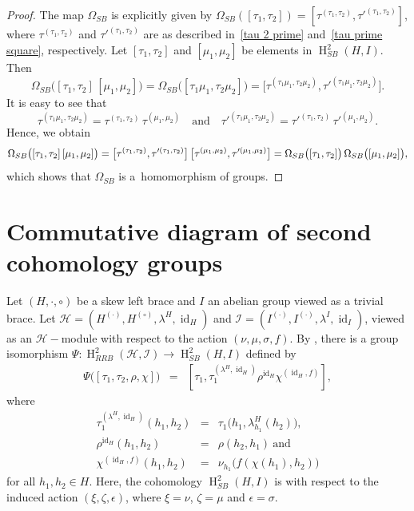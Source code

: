 \documentclass{jonasart}
\theoremstyle{plain}
\DeclareMathOperator{\Ho}{H}
\DeclareMathOperator{\Id}{id}
\begin{document}
	\begin{proof}
		The map $\Omega_{SB}$ is explicitly given by $\Omega_{SB}([\tau_1,\tau_2 ])=[\tau^{(\tau_1,\tau_2 )},\tau'^{(\tau_1,\tau_2 )}]$, where $\tau^{(\tau_1,\tau_2 )}$ and $\tau'^{(\tau_1,\tau_2 )}$ are as described in~\eqref{tau 2 prime} and~\eqref{tau prime square}, respectively.	Let $[\tau_1, \tau_2 ]$ and $[\mu_1,\mu_2 ]$ be elements in $\Ho^2_{SB}(H,I)$. Then
		\[
		\Omega_{SB} \big( [\tau_1,\tau_2] \, [\mu_1,\mu_2] \big) = \Omega_{SB} \big( [\tau_1 \mu_1, \tau_2 \mu_2]\big) =\big[\tau^{(\tau_1 \mu_1, \tau_2 \mu_2)},\tau'^{(\tau_1 \mu_1, \tau_2\mu_2)} \big].
		\]
		It is easy to see that
		\[
		\tau^{(\tau_1 \mu_1, \tau_2 \mu_2)}=	\tau^{(\tau_1, \tau_2)}\, \tau^{(\mu_1,\mu_2)} \quad \textrm{and} \quad  \tau'^{(\tau_1 \mu_1,\tau_2 \mu_2)}=	\tau'^{(\tau_1, \tau_2)}\, \tau'^{(\mu_1, \mu_2)}.
		\]
		Hence, we obtain
		\[
		\Omega_{SB} \big( [\tau_1, \tau_2] \, [\mu_1,\mu_2] \big) = \big[\tau^{(\tau_1, \tau_2)},\tau'^{(\tau_1, \tau_2)}\big] \, \big[\tau^{(\mu_1, \mu_2)},\tau'^{(\mu_1,\mu_2)}\big]\\
		= \Omega_{SB} \big( [\tau_1, \tau_2]\big) \, \Omega_{SB} \big([\mu_1,\mu_2] \big),
		\]
		which shows that $\Omega_{SB}$ is a~homomorphism of groups.
	\end{proof}
	
	
	\section{Commutative diagram of second cohomology groups}\label{section comm diag homol groups}
	
	Let $(H,\cdot,\circ)$ be a skew left brace and $I$ an abelian group viewed as a trivial brace. Let $\mathcal{H}=(H^{(\cdot)},H^{(\circ)},\lambda^H, \Id_H)$ and  $\mathcal{I}=(I^{(\cdot)},I^{(\cdot)},\lambda^I, \Id_I)$, viewed as an $\mathcal{H}-$module with respect to the action $(\nu,\mu,\sigma,f)$. By \cite[Proposition 4.4 and Corollary 4.6]{MR4819014}, there is a group isomorphism $\Psi: \Ho^2_{RRB}(\mathcal{H},\mathcal{I})\to \Ho^2_{SB}(H,I)$ defined by
	\begin{eqnarray}\label{defn of Psi}
		\Psi \big([\tau_1,\tau_2,\rho,\chi] \big)&=&[\tau_1, \tau^{(\lambda^H, \Id_H)}_1\rho^{\Id_H}\chi^{(\Id_H, f)} ],
	\end{eqnarray}
	where
	\begin{eqnarray}
		\tau^{(\lambda^H, \Id_H)}_1(h_1, h_2) &=&  \tau_1 \big(h_1, \lambda^H_{h_1}(h_2)\big), \nonumber\\
		\rho^{\Id_H}(h_1, h_2) &=&\rho(h_2, h_1)~\textrm{and} \nonumber\\
		\chi^{(\Id_H, f)}(h_1, h_2) & =& \nu_{h_1} \big( f(\chi(h_1), h_2) \big) \label{defn of chi id f}
	\end{eqnarray}
	for all $h_1, h_2 \in H$. Here, the cohomology $\Ho^2_{SB}(H,I)$ is with respect to the induced action $(\xi,\zeta,\epsilon)$, where $\xi=\nu$, $\zeta=\mu$ and $\epsilon=\sigma$.
	
\end{document}
